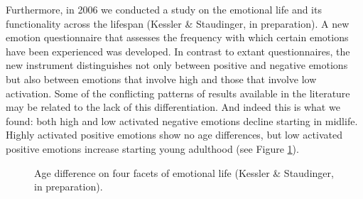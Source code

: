 Furthermore, in 2006 we conducted a study on the emotional life and its functionality across the lifespan (Kessler \& Staudinger, in preparation). A new emotion questionnaire that assesses the frequency with which certain emotions have been experienced was developed. In contrast to extant questionnaires, the new instrument distinguishes not only between positive and negative emotions but also between emotions that involve high and those that involve low activation. Some of the conflicting patterns of results available in the literature may be related to the lack of this differentiation. And indeed this is what we found: both high and low activated negative emotions decline starting in midlife. Highly activated positive emotions show no age differences, but low activated positive emotions increase starting young adulthood (see Figure \ref{fig2:profUrsulaStaudinger}).



\begin{figure}[htb]
  \begin{center}
    \caption{Age difference on four facets of emotional life (Kessler \& Staudinger, in preparation).}
    \label{fig2:profUrsulaStaudinger}
  \end{center}
\end{figure}

